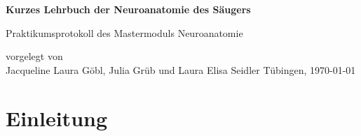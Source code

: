 \documentclass[12pt,a4paper,pdftex]{article}
\begin{document}
\setlength{\parindent}{0pt}


\begin{titlepage}
 \begin{center}
        \vspace*{1cm}
        \LARGE
        \textbf{Kurzes Lehrbuch der Neuroanatomie des Säugers}
        \vspace{2cm}
        
        \Large
        Praktikumsprotokoll des Mastermoduls Neuroanatomie
        \vspace{4cm}
        
        \large
        vorgelegt von \\ Jacqueline Laura Göbl, Julia Grüb und Laura Elisa Seidler %
        \vfill
        \large     
        T\"ubingen, \today
    \end{center}
    \newpage
        \thispagestyle{empty}
        \mbox{}
        \newpage
\end{titlepage}


\thispagestyle{empty}
\mbox{}


\tableofcontents
\newpage
\listoffigures
\listoftables



\newpage
\section{Einleitung}
\end{document}
